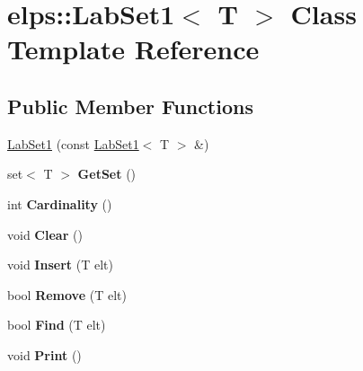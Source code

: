 \hypertarget{classelps_1_1_lab_set1}{\section{elps\+:\+:Lab\+Set1$<$ T $>$ Class Template Reference}
\label{classelps_1_1_lab_set1}
}
\subsection*{Public Member Functions}
\begin{DoxyCompactItemize}
\item 
\hyperlink{classelps_1_1_lab_set1_a615db30364701a0cea588dede18b0ee6}{Lab\+Set1} (const \hyperlink{classelps_1_1_lab_set1}{Lab\+Set1}$<$ T $>$ \&)
\item 
\hypertarget{classelps_1_1_lab_set1_ac3b4a495fa503866258ba309bcc9718c}{set$<$ T $>$ {\bfseries Get\+Set} ()}\label{classelps_1_1_lab_set1_ac3b4a495fa503866258ba309bcc9718c}

\item 
\hypertarget{classelps_1_1_lab_set1_a577e444d7918d077342938e64eb63a24}{int {\bfseries Cardinality} ()}\label{classelps_1_1_lab_set1_a577e444d7918d077342938e64eb63a24}

\item 
\hypertarget{classelps_1_1_lab_set1_a2df7572fbb4dd1e46944c91417beb1cd}{void {\bfseries Clear} ()}\label{classelps_1_1_lab_set1_a2df7572fbb4dd1e46944c91417beb1cd}

\item 
\hypertarget{classelps_1_1_lab_set1_af1f13aaf68e3eb63fc1c950b94304396}{void {\bfseries Insert} (T elt)}\label{classelps_1_1_lab_set1_af1f13aaf68e3eb63fc1c950b94304396}

\item 
\hypertarget{classelps_1_1_lab_set1_aae9a6f1d12c62e13305c19fb3073bc97}{bool {\bfseries Remove} (T elt)}\label{classelps_1_1_lab_set1_aae9a6f1d12c62e13305c19fb3073bc97}

\item 
\hypertarget{classelps_1_1_lab_set1_a688190de58f80831bf49061f64d8dca1}{bool {\bfseries Find} (T elt)}\label{classelps_1_1_lab_set1_a688190de58f80831bf49061f64d8dca1}

\item 
\hypertarget{classelps_1_1_lab_set1_add9651557eccfd15243a518ea77eeb49}{void {\bfseries Print} ()}\label{classelps_1_1_lab_set1_add9651557eccfd15243a518ea77eeb49}


\end{DoxyCompactItemize}
